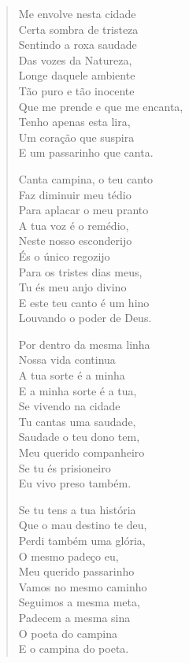 \begin{verse}
Me envolve nesta cidade\\
Certa sombra de tristeza\\
Sentindo a roxa saudade\\
Das vozes da Natureza,\\
Longe daquele ambiente\\
Tão puro e tão inocente\\
Que me prende e que me encanta,\\
Tenho apenas esta lira,\\
Um coração que suspira\\
E um passarinho que canta.

Canta campina, o teu canto\\
Faz diminuir meu tédio\\
Para aplacar o meu pranto\\
A tua voz é o remédio,\\
Neste nosso esconderijo\\
És o único regozijo\\
Para os tristes dias meus,\\
Tu és meu anjo divino\\
E este teu canto é um hino\\
Louvando o poder de Deus.

Por dentro da mesma linha\\
Nossa vida continua\\
A tua sorte é a minha\\
E a minha sorte é a tua,\\
Se vivendo na cidade\\
Tu cantas uma saudade,\\
Saudade o teu dono tem,\\
Meu querido companheiro\\
Se tu és prisioneiro\\
Eu vivo preso também.

Se tu tens a tua história\\
Que o mau destino te deu,\\
Perdi também uma glória,\\
O mesmo padeço eu,\\
Meu querido passarinho\\
Vamos no mesmo caminho\\
Seguimos a mesma meta,\\
Padecem a mesma sina\\
O poeta do campina\\
E o campina do poeta.


\end{verse}
